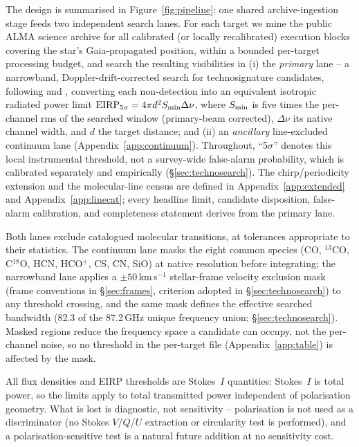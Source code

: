 \documentclass{openjournal}
\begin{document}
The design is summarised in Figure~\ref{fig:pipeline}: one shared
archive-ingestion stage feeds two independent search lanes. For each
target we mine the public ALMA science archive for all calibrated (or
locally recalibrated) execution blocks covering the star's
Gaia-propagated position, within a bounded per-target processing
budget, and search the resulting visibilities in (i) the
\emph{primary} lane -- a narrowband, Doppler-drift-corrected search
for technosignature candidates, following \citet{Mason2024} and
\citet{Enriquez2017}, converting each non-detection into an
equivalent isotropic radiated power limit
$\mathrm{EIRP_{5\sigma}} = 4\pi d^{2} S_{\rm min} \Delta\nu$, where
$S_{\rm min}$ is five times the per-channel rms of the searched
window (primary-beam corrected), $\Delta\nu$ its native channel
width, and $d$ the target distance; and (ii) an \emph{ancillary} line-excluded continuum lane
(Appendix~\ref{app:continuum}). Throughout, ``5$\sigma$'' denotes this local
instrumental threshold, not a survey-wide false-alarm probability,
which is calibrated separately and empirically
(\S\ref{sec:technosearch}). The chirp/periodicity extension and the
molecular-line census are defined in Appendix~\ref{app:extended} and
Appendix~\ref{app:linecat}; every headline limit, candidate
disposition, false-alarm calibration, and completeness statement
derives from the primary lane.

Both lanes exclude catalogued molecular transitions, at tolerances
appropriate to their statistics. The continuum lane masks the eight
common species (CO, $^{13}$CO, C$^{18}$O, HCN, HCO$^{+}$, CS, CN,
SiO) at native resolution before integrating; the narrowband lane
applies a $\pm50$\,km\,s$^{-1}$ stellar-frame velocity exclusion mask
(frame conventions in \S\ref{sec:frames}, criterion adopted in
\S\ref{sec:technosearch}) to any threshold crossing, and the same mask
defines the effective searched bandwidth (82.3 of the 87.2\,GHz
unique frequency union; \S\ref{sec:technosearch}). Masked regions
reduce the frequency space a candidate can occupy, not the per-channel
noise, so no threshold in the per-target file (Appendix~\ref{app:table}) is affected by the
mask.

All flux densities and EIRP thresholds are Stokes~$I$ quantities:
Stokes~$I$ is total power, so the limits apply to total transmitted
power independent of polarisation geometry. What is lost is
diagnostic, not sensitivity -- polarisation is not used as a
discriminator (no Stokes $V$/$Q$/$U$ extraction or circularity test
is performed), and a polarisation-sensitive test is a natural future
addition at no sensitivity cost.
\end{document}
